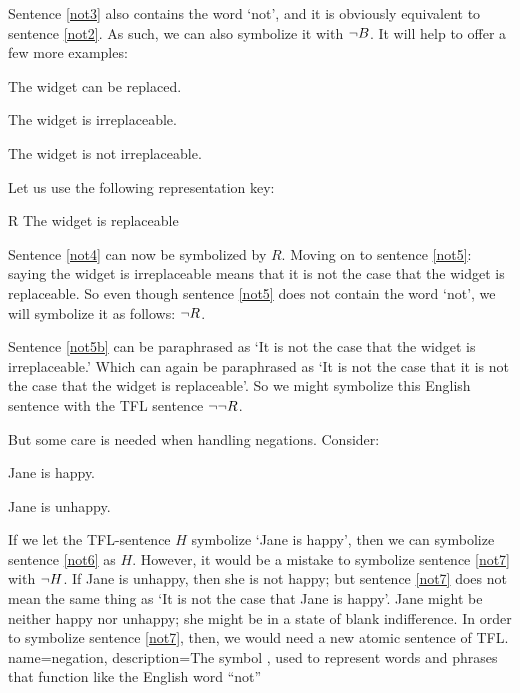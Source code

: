 Sentence \ref{not3} also contains the word `not', and it is obviously equivalent to sentence \ref{not2}. As such, we can also symbolize it with $\neg B$.
It will help to offer a few more examples:
	\begin{earg}
		\item[\ex{not4}] The widget can be replaced.
		\item[\ex{not5}] The widget is irreplaceable.
		\item[\ex{not5b}] The widget is not irreplaceable.
	\end{earg}
Let us use the following representation key:
	\begin{ekey}
		\item[R] The widget is replaceable
	\end{ekey}
Sentence \ref{not4} can now be symbolized by $R$. Moving on to sentence \ref{not5}: saying the widget is irreplaceable means that it is not the case that the widget is replaceable. So even though sentence \ref{not5} does not contain the word `not', we will symbolize it as follows: $\neg R$.

Sentence \ref{not5b} can be paraphrased as `It is not the case that the widget is irreplaceable.' Which can again be paraphrased as `It is not the case that it is not the case that the widget is replaceable'. So we might symbolize this English sentence with the TFL sentence $\neg\neg R$.

But some care is needed when handling negations. Consider:
	\begin{earg}
		\item[\ex{not6}] Jane is happy.
		\item[\ex{not7}] Jane is unhappy.
	\end{earg}
If we let the TFL-sentence $H$ symbolize  `Jane is happy', then we can symbolize sentence \ref{not6} as $H$. However, it would be a mistake to symbolize sentence \ref{not7} with $\neg{H}$. If Jane is unhappy, then she is not happy; but sentence \ref{not7} does not mean the same thing as `It is not the case that Jane is happy'. Jane might be neither happy nor unhappy; she might be in a state of blank indifference. In order to symbolize sentence \ref{not7}, then, we would need a new atomic sentence of TFL.
{
name=negation,
description={The symbol \enot, used to represent words and phrases that function like the English word ``not''}
}

